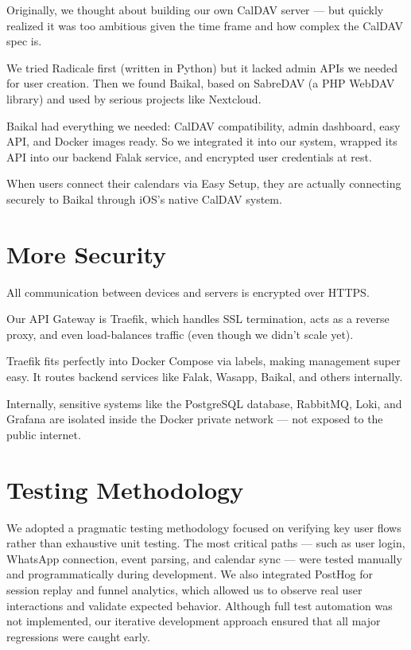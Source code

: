 Originally, we thought about building our own CalDAV server — but quickly realized it was too ambitious given the time frame and how complex the CalDAV spec is.

We tried Radicale first (written in Python) but it lacked admin APIs we needed for user creation. Then we found Baikal, based on SabreDAV (a PHP WebDAV library) and used by serious projects like Nextcloud.

Baikal had everything we needed: CalDAV compatibility, admin dashboard, easy API, and Docker images ready. So we integrated it into our system, wrapped its API into our backend Falak service, and encrypted user credentials at rest.

When users connect their calendars via Easy Setup, they are actually connecting securely to Baikal through iOS’s native CalDAV system.

\section{More Security}

All communication between devices and servers is encrypted over HTTPS.

Our API Gateway is Traefik, which handles SSL termination, acts as a reverse proxy, and even load-balances traffic (even though we didn't scale yet).

Traefik fits perfectly into Docker Compose via labels, making management super easy. It routes backend services like Falak, Wasapp, Baikal, and others internally.

Internally, sensitive systems like the PostgreSQL database, RabbitMQ, Loki, and Grafana are isolated inside the Docker private network — not exposed to the public internet.

\section{Testing Methodology}

We adopted a pragmatic testing methodology focused on verifying key user flows rather than exhaustive unit testing. The most critical paths — such as user login, WhatsApp connection, event parsing, and calendar sync — were tested manually and programmatically during development. We also integrated PostHog for session replay and funnel analytics, which allowed us to observe real user interactions and validate expected behavior. Although full test automation was not implemented, our iterative development approach ensured that all major regressions were caught early.

